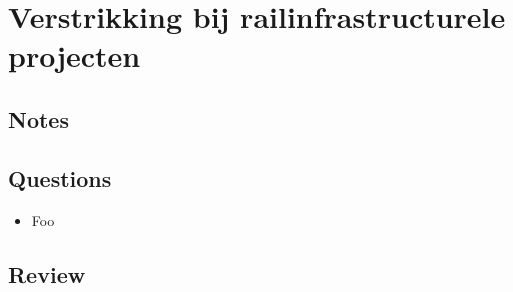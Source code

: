 \chapter{Verstrikking bij railinfrastructurele projecten \cite{de2012verstrikking}}
\section{Notes}

\section{Questions}
\begin{itemize}
  \item Foo
\end{itemize}

\section{Review}
